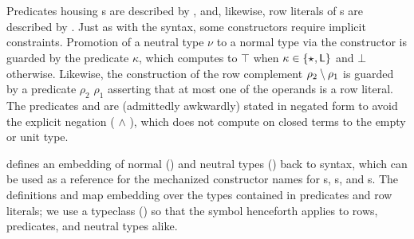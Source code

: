 \documentclass[sigplan,screen]{acmart}
\begin{document}
\begin{AgdaAlign}
\begin{code}%
%
\>[2]\AgdaSpace{}%
%
\>[19]\AgdaSymbol{:}\AgdaSpace{}%
\AgdaSpace{}%
\AgdaSpace{}%
\AgdaSpace{}%
\AgdaSpace{}%
\<%
\\
%
\>[2]\AgdaSpace{}%
\AgdaSpace{}%
\AgdaSymbol{:}\AgdaSpace{}%
\AgdaSpace{}%
\AgdaSpace{}%
\AgdaSpace{}%
\AgdaSpace{}%
\<%
\end{code}
\begin{code}[hide]%
%
\>[2]\AgdaSpace{}%
\AgdaSpace{}%
\<%
\\
%
\>[2]\AgdaSpace{}%
\AgdaSpace{}%
\<%
\end{code}
\end{AgdaAlign}

\Rome{} Predicates housing s are described by  \Symbol{(}  \Constructor{R[}\Constructor{]}\Symbol{)}, and, likewise, row literals of s are described by  \Symbol{(}  \Symbol{)}. Just as with the  syntax, some constructors require implicit constraints. Promotion of a neutral type $\nu$ to a normal type via the constructor  is guarded by the predicate  $\kappa$, which computes to $\top$ when $\kappa \in \{ \star_{} , \mathsf{L} \}$ and $\bot$ otherwise. Likewise, the construction of the row complement $\rho_{2} \setminus \rho_{1}$ is guarded by a predicate  \Symbol{(} $\rho_{2}$ $\rho_{1}$\Symbol{)} asserting that at most one of the operands is a row literal. The predicates  and  are (admittedly awkwardly) stated in negated form to avoid the explicit negation  (  $\wedge$  ), which does not compute on closed terms to the empty or unit type.


 defines an embedding of normal () and neutral types () back to  syntax, which can be used as a reference for the mechanized constructor names for s, s, and s. The definitions  and  map embedding over the types contained in predicates and row literals; we use a typeclass () so that the symbol  henceforth applies to rows, predicates, and neutral types alike.
\end{document}
